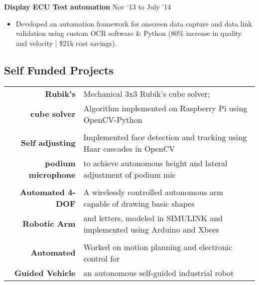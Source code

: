 \documentclass[a4paper,10pt]{article} %
\begin{document}

 \textbf{Display ECU Test automation} \hfill Nov ‘13 to July '14 
\begin{itemize} \itemsep -2pt %
\item Developed an automation framework for onscreen data capture and data link validation using custom OCR software \& Python (80\% increase in quality and velocity | \$21k cost savings).
\end{itemize}



\subsection{Self Funded Projects}

\begin{tabular}{rl}	
\ \textbf{Rubik’s} & Mechanical 3x3 Rubik's cube solver; \\
\ \textbf{cube solver} & Algorithm implemented on Raspberry Pi using OpenCV-Python\\
&\\

\ \textbf{Self adjusting}  & Implemented face detection and tracking using Haar cascades in OpenCV \\
\ \textbf{podium microphone} & to achieve autonomous height and lateral adjustment of podium mic\\ & \\
\ \textbf{Automated 4-DOF} &  A wirelessly controlled autonomous arm capable of drawing basic shapes  \\
\ \textbf{Robotic Arm} &  and letters, modeled in SIMULINK and implemented using Arduino and Xbees\\ & \\
\ \textbf{Automated }& Worked on motion planning and electronic control for \\
\ \textbf{Guided Vehicle} & an autonomous self-guided industrial robot\\


\end{tabular}

\end{document}

